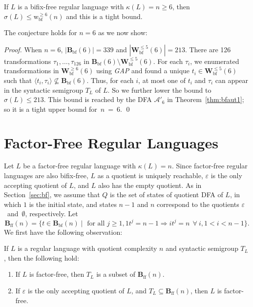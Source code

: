 \documentclass{llncs}
\renewcommand{\le}{\leqslant}
\renewcommand{\ge}{\geqslant}
\newcommand{\eps}{\varepsilon}
\newcommand{\be}{\begin{enumerate}}
\newcommand{\ee}{\end{enumerate}}
\newcommand{\txt}[1]{\mbox{ #1 }}
\newcommand{\cA}{{\mathcal A}}
\newcommand{\Bbf}{\mathbf{B}_{\mathrm{bf}}}
\newcommand{\Bff}{\mathbf{B}_{\mathrm{ff}}}
\newcommand{\Vbf}{\mathbf{W}^{\le 5}_{\mathrm{bf}}}
\newcommand{\Wbf}{\mathbf{W}^{\ge 6}_{\mathrm{bf}}}
\newcommand{\wbf}{{\mathrm{w}^{\ge 6}_{\mathrm{bf}}}}
\begin{document}
\smallskip

\begin{conjecture}
\label{con:bf}
If $L$ is a bifix-free regular language with $\kappa(L) = n \ge 6$, then $\sigma(L) \le \wbf(n)$ and this is a tight bound. 
\end{conjecture}

\smallskip

The conjecture holds for $n=6$ as we now show:
\begin{proof} 
When $n = 6$, $|\Bbf(6)| = 339$ and $|\Vbf(6)| = 213$. There are 126 transformations $\tau_1,\ldots,\tau_{126}$ in $\Bbf(6) \setminus \Vbf(6)$. For each $\tau_i$, we enumerated transformations in $\Wbf(6)$ using \emph{GAP} and found a unique $t_i \in \Vbf(6)$ such that $\langle t_i, \tau_i \rangle \not\subseteq \Bbf(6)$. Thus, for each $i$, at most one of $t_i$ and $\tau_i$ can appear in the syntactic semigroup $T_L$ of $L$. So we further lower the bound to $\sigma(L) \le 213$. This bound is reached by the DFA $\cA'_6$ in Theorem~\ref{thm:bfaut1}; so it is a tight upper bound for~$n~=~6$. \qed
\end{proof}

\section{Factor-Free Regular Languages}\label{sec:ff}

Let $L$ be a factor-free regular language with $\kappa(L) = n$. Since factor-free regular languages are also bifix-free, $L$ as a quotient is uniquely reachable, $\eps$ is the only accepting quotient of $L$, and $L$ also has the empty quotient. As in Section~\ref{sec:bf}, we assume that $Q$ is the set of states of quotient DFA of $L$, in which $1$ is the initial state, and states $n-1$ and $n$ correspond to the quotients $\eps$~and~$\emptyset$, respectively. Let 
$$\Bff(n) = \{t \in \Bbf(n) \mid \txt{for all} j \ge 1, 1t^j = n - 1 \Rightarrow it^j = n ~~\forall~i, 1 < i < n-1 \}.$$
We first have the following observation: 

\begin{proposition}\label{prop:ff}
If $L$ is a regular language with quotient complexity $n$ and syntactic semigroup $T_L$, then the following hold: 
\be 
\item If $L$ is factor-free, then $T_L$ is a subset of $\Bff(n)$. 
\item If $\eps$ is the only accepting quotient of $L$, and $T_L \subseteq \Bff(n)$, then $L$ is factor-free. 
\ee
\end{proposition}
\end{document}
